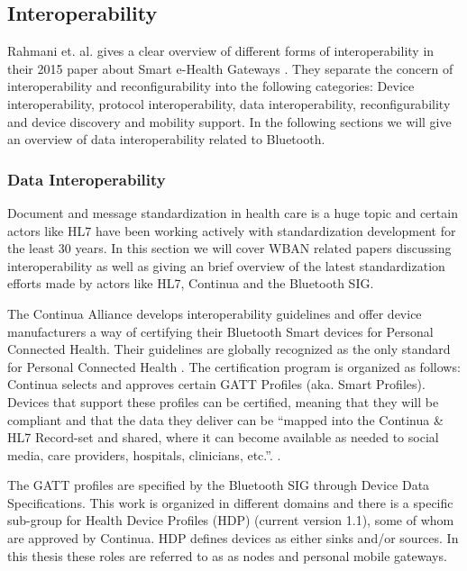 
\subsection{Interoperability} %
\label{sub:interoperability}

Rahmani et. al. gives a clear overview of different forms of interoperability in their 2015 paper about Smart e-Health Gateways \cite{DrAmirMohammadRahmani:2014vx}. They separate the concern of interoperability and reconfigurability into the following categories: Device interoperability, protocol interoperability, data interoperability, reconfigurability and device discovery and mobility support. In the following sections we will give an overview of data interoperability related to Bluetooth.

\subsubsection{Data Interoperability} %
\label{ssub:data_interoperability}


Document and message standardization in health care is a huge topic and certain actors like HL7 have been working actively with standardization development for the least 30 years. In this section we will cover WBAN related papers discussing interoperability as well as giving an brief overview of the latest standardization efforts made by actors like HL7, Continua and the Bluetooth SIG.

The Continua Alliance develops interoperability guidelines and offer device manufacturers a way of certifying their Bluetooth Smart devices for Personal Connected Health. Their guidelines are globally recognized as the only standard for Personal Connected Health \cite{newRef_27}. The certification program is organized as follows: Continua selects and approves certain GATT Profiles (aka. Smart Profiles). Devices that support these profiles can be certified, meaning that they will be compliant and that the data they deliver can be ``mapped into the Continua & HL7 Record-set and shared, where it can become available as needed to social media, care providers, hospitals, clinicians, etc.''. \cite{newRef_27}.

The GATT profiles are specified by the Bluetooth SIG through Device Data Specifications. This work is organized in different domains and there is a specific sub-group for Health Device Profiles (HDP) (current version 1.1), some of whom are approved by Continua. HDP defines devices as either sinks and/or sources. In this thesis these roles are referred to as as nodes and personal mobile gateways.

